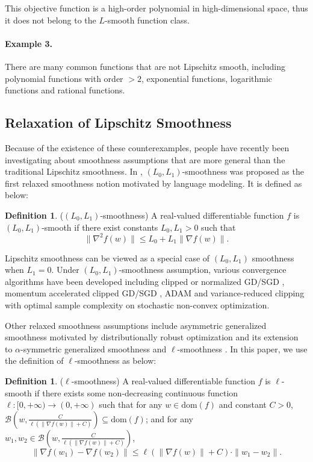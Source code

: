 \documentclass{article} %
\theoremstyle{plain}
\theoremstyle{definition}
\newtheorem{definition}[theorem]{Definition}
\theoremstyle{remark}
\begin{document}
This objective function is a high-order polynomial in high-dimensional space, thus it does not belong to the \( L \)-smooth function class.

\paragraph{Example 3.} There are many common functions that are not Lipschitz smooth, including polynomial functions with order $>2$, exponential functions, logarithmic functions and rational functions.

\subsection{Relaxation of Lipschitz Smoothness}

Because of the existence of these counterexamples, people have recently been investigating about smoothness assumptions that are more general than the traditional Lipschitz smoothness. In \citet{zhang2019gradient}, $(L_0,L_1)$-smoothness was proposed as the first relaxed smoothness notion motivated by language modeling. It is defined as below:
\begin{definition}
    ($(L_0,L_1)$-smoothness) A real-valued differentiable function $f$ is $(L_0,L_1)$-smooth if there exist constants $L_0, L_1>0$ such that
    $$\|\nabla^2 f(w)\| \leq L_0+L_1\|\nabla f(w)\|.$$
\end{definition}

Lipschitz smoothness can be viewed as a special case of $(L_0,L_1)$ smoothness when $L_1=0$. Under $(L_0,L_1)$-smoothness assumption, various convergence algorithms have been developed including clipped or normalized GD/SGD
\citep{zhang2019gradient}, momentum accelerated clipped GD/SGD \citep{zhang2020improved}, ADAM \citep{wang2022provable} and variance-reduced clipping \citep{reisizadeh2023variance} with optimal sample complexity on stochastic non-convex optimization. 

Other relaxed smoothness assumptions include asymmetric generalized smoothness motivated by distributionally robust optimization \citep{jin2021non} and its extension to $\alpha$-symmetric generalized smoothness \citep{chen2023generalized} and $\ell$-smoothness \citep{li2023convex}. In this paper, we use the definition of $\ell$-smoothness as below:

\begin{definition}
\label{def:gs}
    ($\ell$-smoothness) A real-valued differentiable function $f$ is $\ell$-smooth if there exists some non-decreasing continuous function $\ell:[0,+\infty)\rightarrow (0,+\infty)$ such that for any $w\in \text{dom}(f)$ and constant $C>0$, $\mathcal{B}(w,
    \frac{C}{\ell(\|\nabla f(w)\|+C)})\subseteq \text{dom}(f)$; and for any $w_1,w_2\in \mathcal{B}(w, \frac{C}{\ell(\|\nabla f(w)\|+C)})$,
    $$\|\nabla f(w_1)-\nabla f(w_2)\|\leq \ell (\|\nabla f(w)\|+C)\cdot\|w_1-w_2\|.$$
\end{definition} 
\end{document}
